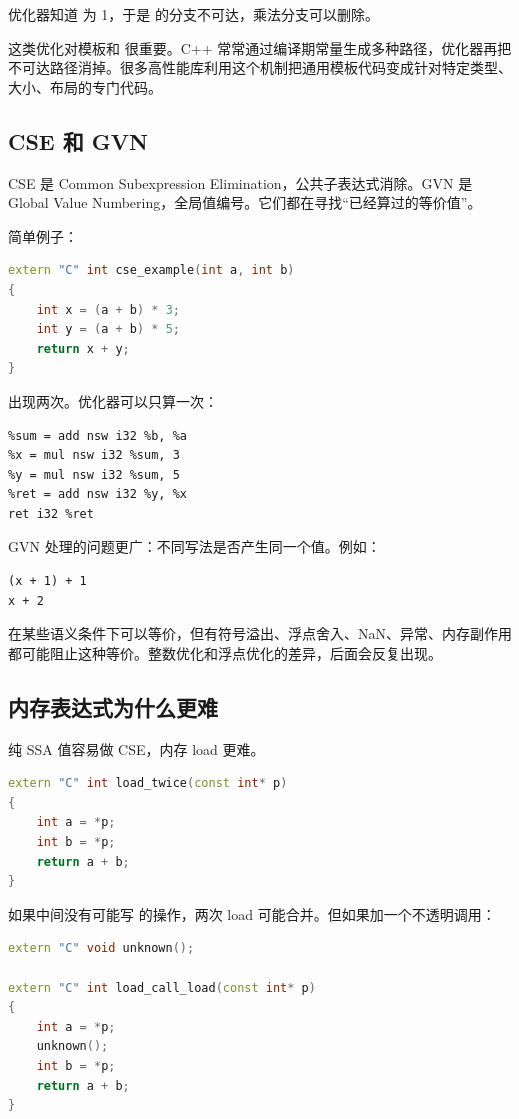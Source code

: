 优化器知道  为 1，于是  的分支不可达，乘法分支可以删除。

这类优化对模板和  很重要。C++ 常常通过编译期常量生成多种路径，优化器再把不可达路径消掉。很多高性能库利用这个机制把通用模板代码变成针对特定类型、大小、布局的专门代码。

\subsection{CSE 和 GVN}

CSE 是 Common Subexpression Elimination，公共子表达式消除。GVN 是 Global Value Numbering，全局值编号。它们都在寻找“已经算过的等价值”。

简单例子：

\begin{lstlisting}[language=C++]
extern "C" int cse_example(int a, int b)
{
    int x = (a + b) * 3;
    int y = (a + b) * 5;
    return x + y;
}
\end{lstlisting}

 出现两次。优化器可以只算一次：

\begin{lstlisting}
%sum = add nsw i32 %b, %a
%x = mul nsw i32 %sum, 3
%y = mul nsw i32 %sum, 5
%ret = add nsw i32 %y, %x
ret i32 %ret
\end{lstlisting}

GVN 处理的问题更广：不同写法是否产生同一个值。例如：

\begin{lstlisting}
(x + 1) + 1
x + 2
\end{lstlisting}

在某些语义条件下可以等价，但有符号溢出、浮点舍入、NaN、异常、内存副作用都可能阻止这种等价。整数优化和浮点优化的差异，后面会反复出现。

\subsection{内存表达式为什么更难}

纯 SSA 值容易做 CSE，内存 load 更难。

\begin{lstlisting}[language=C++]
extern "C" int load_twice(const int* p)
{
    int a = *p;
    int b = *p;
    return a + b;
}
\end{lstlisting}

如果中间没有可能写  的操作，两次 load 可能合并。但如果加一个不透明调用：

\begin{lstlisting}[language=C++]
extern "C" void unknown();

extern "C" int load_call_load(const int* p)
{
    int a = *p;
    unknown();
    int b = *p;
    return a + b;
}
\end{lstlisting}

